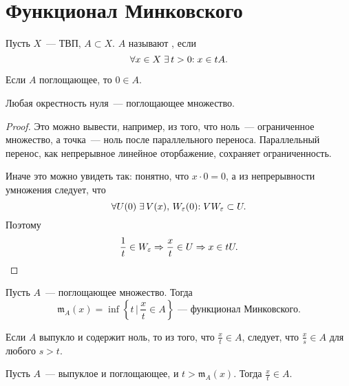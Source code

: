 \documentclass{notes}
\newcommand{\mink}{\mathfrak{m}}
\begin{document}
\section{Функционал Минковского}
	
	\begin{de}
		Пусть $X$~--- ТВП, $A \subset X$. $A$ называют , если 
		\[
			\forall x \in X \; \exists \, t > 0 \text{\text{:}} \; x \in tA.
		\]
	\end{de}

	\begin{rem}
		Если $A$ поглощающее, то $0 \in A$.
	\end{rem}

	\begin{st}
		Любая окрестность нуля~--- поглощающее множество.
		\begin{proof}
			Это можно вывести, например, из того, что ноль~--- ограниченное множество, а точка~--- ноль после параллельного переноса. Параллельный перенос, как непрерывное линейное оторбажение, сохраняет ограниченность.

			Иначе это можно увидеть так: понятно, что $x \cdot 0 = 0$, а из непрерывности умножения следует, что
			\[
				\forall U(0) \; \exists \, V(x), \, W_{\varepsilon}(0)\text{\text{:}} \; V W_{\varepsilon} \subset U.
			\]
			Поэтому
			\[
				\dfrac{1}{t} \in W_{\varepsilon} \Rightarrow \dfrac{x}{t} \in U \Rightarrow x \in tU.
			\]
		\end{proof}
	\end{st}

	\begin{de}
		Пусть $A$~--- поглощающее множество. Тогда 
		\[
			\mink_A(x) = \inf \left\{t \, \big| \, \dfrac{x}{t} \in A\right\} \text{~--- функционал Минковского.}
		\]
	\end{de}

	\begin{rem}
		Если $A$ выпукло и содержит ноль, то из того, что $\tfrac{x}{t} \in A$, следует, что $\tfrac{x}{s} \in A$ для любого $s > t$.
	\end{rem}

	\begin{st}
		Пусть $A$~--- выпуклое и поглощающее, и $t > \mink_A(x)$. Тогда $\tfrac{x}{t} \in A$.
	\end{st}
\end{document}
